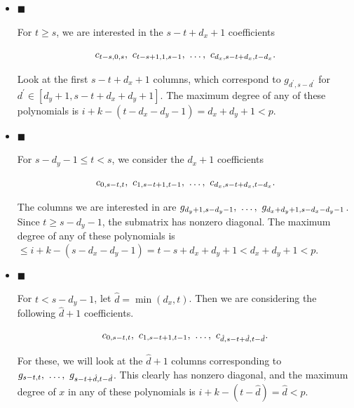 \documentclass[10pt,a4paper]{article}
\begin{document}
\begin{itemize}


\item[] 
$\blacksquare$ 


For $t\geq s$, we are interested in the $s-t+d_{x}+1$ coefficients\par


\[\begin{gathered}
c_{t-s,0,s},\nobreak\ c_{t-s+1,1,s-1},\nobreak\ \dots,\nobreak\ c_{d_{x},s-t+d_{x},t-d_{x}}.
\end{gathered}\]


Look at the first $s-t+d_{x}+1$ columns, which correspond to $g_{d^{\prime},s-d^{\prime}}$ for $d^{\prime}\in[d_{y}+1,s-t+d_{x}+d_{y}+1]$. The maximum degree of any of these polynomials is $i+k-(t-d_{x}-d_{y}-1)=d_{x}+d_{y}+1<p$.\par





\item[] 
$\blacksquare$ 


For $s-d_{y}-1\leq t<s$, we consider the $d_{x}+1$ coefficients\par


\[\begin{gathered}
c_{0,s-t,t},\nobreak\ c_{1,s-t+1,t-1},\nobreak\ \dots,\nobreak\ c_{d_{x},s-t+d_{x},t-d_{x}}.
\end{gathered}\]


The columns we are interested in are $g_{d_{y}+1,s-d_{y}-1},\nobreak\ \dots,\nobreak\ g_{d_{x}+d_{y}+1,s-d_{x}-d_{y}-1}$. Since $t\geq s-d_{y}-1$, the submatrix has nonzero diagonal. The maximum degree of any of these polynomials is $\leq i+k-(s-d_{x}-d_{y}-1)=t-s+d_{x}+d_{y}+1<d_{x}+d_{y}+1<p$.\par





\item[] 
$\blacksquare$ 


For $t<s-d_{y}-1$, let $\hat{d}=\min(d_{x},t)$. Then we are considering the following $\hat{d}+1$ coefficients.\par


\[\begin{gathered}
c_{0,s-t,t},\nobreak\ c_{1,s-t+1,t-1},\nobreak\ \dots,\nobreak\ c_{\hat{d},s-t+\hat{d},t-\hat{d}}.
\end{gathered}\]


For these, we will look at the $\hat{d}+1$ columns corresponding to $g_{s-t,t},\nobreak\ \dots,\nobreak\ g_{s-t+\hat{d},t-\hat{d}}$. This clearly has nonzero diagonal, and the maximum degree of $x$ in any of these polynomials is $i+k-(t-\hat{d})=\hat{d}<p$.\par





\end{itemize}
\end{document}
